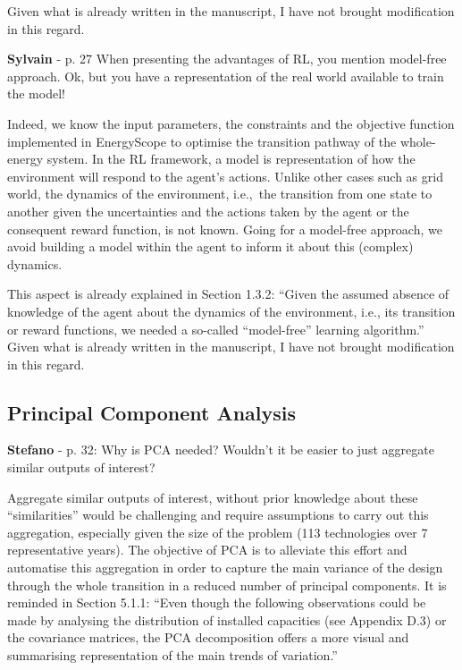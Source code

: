\documentclass[12pt,a4paper]{article}
\def\ie{i.e.,\ }
\begin{document}
Given what is already written in the manuscript, I have not brought modification in this regard.

\begin{mdframed}[style=comment] %
{\color{purple} \textbf{Sylvain}} - p. 27 When presenting the advantages of RL, you mention model-free approach. Ok, but you have a representation of the real world available to train the model!
\end{mdframed}

\noindent Indeed, we know the input parameters, the constraints and the objective function implemented in EnergyScope to optimise the transition pathway of the whole-energy system. In the RL framework, a model is representation of how the environment will respond to the agent's actions. Unlike other cases such as grid world, the dynamics of the environment, \ie the transition from one state to another given the uncertainties and the actions taken by the agent or the consequent reward function, is not known.  Going for a model-free approach, we avoid building a model within the agent to inform it about this (complex) dynamics.

This aspect is already explained in Section 1.3.2: ``Given the assumed absence of knowledge of the agent about the dynamics of the environment, i.e., its transition or reward functions, we needed a so-called ``model-free'' learning algorithm.'' Given what is already written in the manuscript, I have not brought modification in this regard.

\subsection{Principal Component Analysis}
\label{methodo_PCA}

\begin{mdframed}[style=comment] %
{\color{orange} \textbf{Stefano}} - p. 32: Why is PCA needed? Wouldn’t it be easier to just aggregate similar outputs of interest?
\end{mdframed}

\noindent Aggregate similar outputs of interest, without prior knowledge about these ``similarities'' would be challenging and require assumptions to carry out this aggregation, especially given the size of the problem (113 technologies over 7 representative years). The objective of PCA is to alleviate this effort and automatise this aggregation in order to capture the main variance of the design through the whole transition in a reduced number of principal components. It is reminded in Section 5.1.1: ``Even though the following observations could be made by analysing the distribution of installed capacities (see Appendix D.3) or the covariance matrices, the PCA decomposition offers a more visual and summarising representation of the main trends of variation.''
\end{document}
